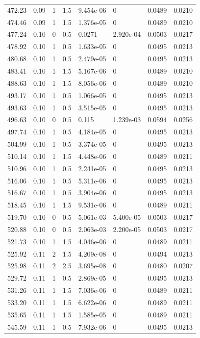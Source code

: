 \documentclass[preview]{standalone}
\begin{document}
{{{\begin{tabular}{L{1.2cm}C{1.2cm} C{0.3cm}C{0.5cm} C{1.4cm}C{1.4cm} C{1.4cm}C{1.4cm}}
  472.23  &  0.09  & 1     & 1.5 &  9.454e-06  & 0  & 0.0489 &  0.0210   \\ 
  474.46  &  0.09  & 1     & 1.5 &  1.376e-05  & 0  & 0.0489 &  0.0210   \\ 
  477.24  &  0.10  & 0     & 0.5 &  0.0271  & 2.920e-04  & 0.0503 &  0.0217   \\ 
  478.92  &  0.10  & 1     & 0.5 &  1.633e-05  & 0  & 0.0495 &  0.0213   \\ 
  480.68  &  0.10  & 1     & 0.5 &  2.479e-05  & 0  & 0.0495 &  0.0213   \\ 
  483.41  &  0.10  & 1     & 1.5 &  5.167e-06  & 0  & 0.0489 &  0.0210   \\ 
  488.63  &  0.10  & 1     & 1.5 &  8.056e-06  & 0  & 0.0489 &  0.0210   \\ 
  493.17  &  0.10  & 1     & 0.5 &  1.066e-05  & 0  & 0.0495 &  0.0213   \\ 
  493.63  &  0.10  & 1     & 0.5 &  3.515e-05  & 0  & 0.0495 &  0.0213   \\ 
  496.63  &  0.10  & 0     & 0.5 &  0.115  & 1.239e-03  & 0.0594 &  0.0256   \\ 
  497.74  &  0.10  & 1     & 0.5 &  4.184e-05  & 0  & 0.0495 &  0.0213   \\ 
  504.99  &  0.10  & 1     & 0.5 &  3.374e-05  & 0  & 0.0495 &  0.0213   \\ 
  510.14  &  0.10  & 1     & 1.5 &  4.448e-06  & 0  & 0.0489 &  0.0211   \\ 
  510.96  &  0.10  & 1     & 0.5 &  2.241e-05  & 0  & 0.0495 &  0.0213   \\ 
  516.06  &  0.10  & 1     & 0.5 &  5.311e-06  & 0  & 0.0495 &  0.0213   \\ 
  516.67  &  0.10  & 1     & 0.5 &  3.904e-06  & 0  & 0.0495 &  0.0213   \\ 
  518.45  &  0.10  & 1     & 1.5 &  9.531e-06  & 0  & 0.0489 &  0.0211   \\ 
  519.70  &  0.10  & 0     & 0.5 &  5.061e-03  & 5.400e-05  & 0.0503 &  0.0217   \\ 
  520.88  &  0.10  & 0     & 0.5 &  2.063e-03  & 2.200e-05  & 0.0503 &  0.0217   \\ 
  521.73  &  0.10  & 1     & 1.5 &  4.046e-06  & 0  & 0.0489 &  0.0211   \\ 
  525.92  &  0.11  & 2     & 1.5 &  4.209e-08  & 0  & 0.0494 &  0.0213   \\ 
  525.98  &  0.11  & 2     & 2.5 &  3.695e-08  & 0  & 0.0480 &  0.0207   \\ 
  529.72  &  0.11  & 1     & 0.5 &  2.869e-05  & 0  & 0.0495 &  0.0213   \\ 
  531.26  &  0.11  & 1     & 1.5 &  7.036e-06  & 0  & 0.0489 &  0.0211   \\ 
  533.20  &  0.11  & 1     & 1.5 &  6.622e-06  & 0  & 0.0489 &  0.0211   \\ 
  535.65  &  0.11  & 1     & 1.5 &  1.585e-05  & 0  & 0.0489 &  0.0211   \\ 
  545.59  &  0.11  & 1     & 0.5 &  7.932e-06  & 0  & 0.0495 &  0.0213   \\ 
\hline 
\end{tabular} 

}}}
\end{document}
